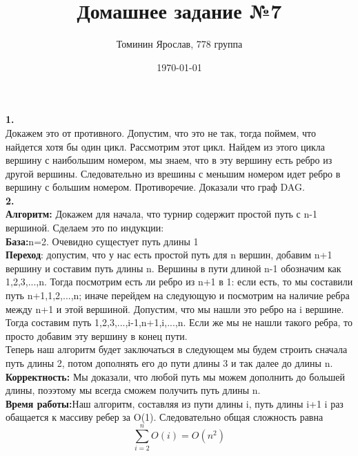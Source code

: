 \documentclass[a4paper,12pt]{article}
\author{Томинин Ярослав, 778 группа}
\title{Домашнее задание №7}
\date{\today}
\begin{document}
 

\maketitle
\newpage
\textbf{1.}\\
Докажем это от противного. Допустим, что это не так, тогда поймем, что найдется хотя бы один цикл. Рассмотрим этот цикл. Найдем из этого цикла вершину с наибольшим номером, мы знаем, что в эту вершину есть ребро из другой вершины. Следовательно из врешины с меньшим номером идет ребро в вершину с большим номером.  Противоречие. Доказали что граф DAG.\\
\textbf{2.}\\
\textbf{Алгоритм:} Докажем для начала, что турнир содержит простой путь с n-1 вершиной. Сделаем это по индукции: \\
\textbf{База:}n=2. Очевидно сущестует путь длины 1\\
\textbf{Переход}:  допустим, что у нас есть простой путь для n вершин, добавим n+1 вершину и составим путь длины n. Вершины в пути длиной n-1 обозначим как 1,2,3,...,n. Тогда посмотрим есть ли ребро из n+1 в 1: если есть, то мы составили путь n+1,1,2,...,n;  иначе перейдем на следующую и посмотрим на наличие ребра между n+1 и этой вершиной. Допустим, что мы нашли это ребро на i вершине. Тогда составим путь 1,2,3,...,i-1,n+1,i,...,n. Если же мы не нашли такого ребра, то просто добавим эту вершину в конец пути.\\
Теперь наш алгоритм будет заключаться в следующем мы будем строить сначала путь длины 2, потом дополнять его до пути длины 3 и так далее до длины n.\\
\textbf{Корректность:} Мы доказали, что любой путь мы можем дополнить до большей длины, поээтому мы всегда сможем получить путь длины n.\\
\textbf{Время работы:}Наш алгоритм, составляя из пути длины i, путь длины i+1 i раз обащается к массиву ребер за O(1). Следовательно общая сложность равна \[\sum_{i=2}^{n} O(i)=O(n^2)\]
\\
\end{document}
